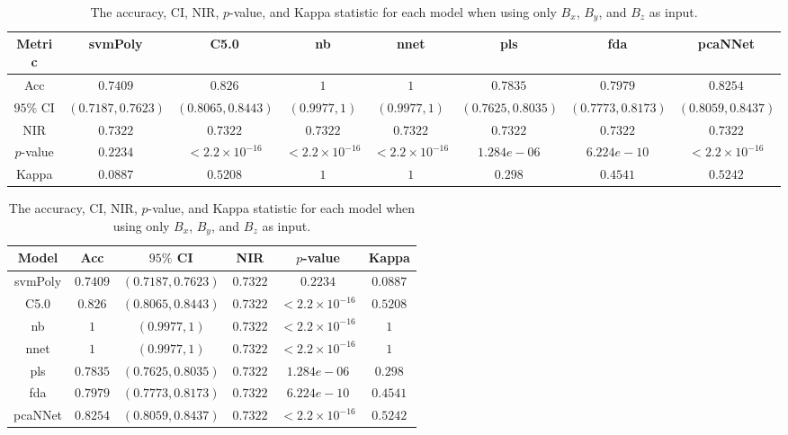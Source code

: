 \begin{table}[!ht]
	\centering
	\begin{tabular}{|c|c|c|c|c|c|c|c|}
		\hline
		Metric & svmPoly & C5.0 & nb & nnet & pls & fda & pcaNNet \\ \hline
		Acc & $0.7409$ & $0.826$ & $1$ & $1$ & $0.7835$ & $0.7979$ & $0.8254$ \\ \hline
		$95\%$ CI & $(0.7187, 0.7623)$ & $(0.8065, 0.8443)$ & $(0.9977, 1)$ & $(0.9977, 1)$ & $(0.7625, 0.8035)$ & $(0.7773, 0.8173)$ & $(0.8059, 0.8437)$ \\ \hline
		NIR & $0.7322$ & $0.7322$ & $0.7322$ & $0.7322$ & $0.7322$ & $0.7322$ & $0.7322$ \\ \hline
		$p$-value & $0.2234$ & $< 2.2 \times {10}^{-16}$ & $< 2.2 \times {10}^{-16}$ & $< 2.2 \times {10}^{-16}$ & $1.284e-06$ & $6.224e-10$ & $< 2.2 \times {10}^{-16}$ \\ \hline
		Kappa & $0.0887$ & $0.5208$ & $1$ & $1$ & $0.298$ & $0.4541$ & $0.5242$ \\ \hline
	\end{tabular}
	\caption{The accuracy, CI, NIR, $p$-value, and Kappa statistic for each model when using only $B_{x}$, $B_{y}$, and $B_{z}$ as input.}
	\label{tab:stats:coord}
\end{table}

\begin{table}[!ht]
	\centering
	\begin{tabular}{|c|c|c|c|c|c|}
		\hline
		Model & Acc & $95\%$ CI & NIR & $p$-value & Kappa \\ \hline
		svmPoly & $0.7409$ & $(0.7187, 0.7623)$ & $0.7322$ & $0.2234$ & $0.0887$ \\ \hline
		C5.0 & $0.826$ & $(0.8065, 0.8443)$ & $0.7322$ & $< 2.2 \times {10}^{-16}$ & $0.5208$ \\ \hline
		nb & $1$ & $(0.9977, 1)$ & $0.7322$ & $< 2.2 \times {10}^{-16}$ & $1$ \\ \hline
		nnet & $1$ & $(0.9977, 1)$ & $0.7322$ & $< 2.2 \times {10}^{-16}$ & $1$ \\ \hline
		pls & $0.7835$ & $(0.7625, 0.8035)$ & $0.7322$ & $1.284e-06$ & $0.298$ \\ \hline
		fda & $0.7979$ & $(0.7773, 0.8173)$ & $0.7322$ & $6.224e-10$ & $0.4541$ \\ \hline
		pcaNNet & $0.8254$ & $(0.8059, 0.8437)$ & $0.7322$ & $< 2.2 \times {10}^{-16}$ & $0.5242$ \\ \hline
	\end{tabular}
	\caption{The accuracy, CI, NIR, $p$-value, and Kappa statistic for each model when using only $B_{x}$, $B_{y}$, and $B_{z}$ as input.}
	\label{tab:stats:reverse:coord}
\end{table}

